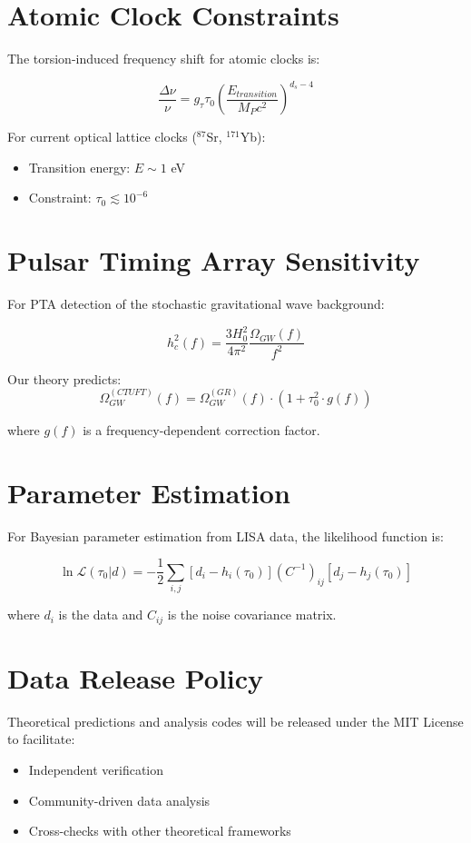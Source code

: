 \section{Atomic Clock Constraints}

The torsion-induced frequency shift for atomic clocks is:

\begin{equation}
    \frac{\Delta \nu}{\nu} = g_\tau \tau_0 \left(\frac{E_{transition}}{M_P c^2}\right)^{d_s - 4}
\end{equation}

For current optical lattice clocks ($^{87}$Sr, $^{171}$Yb):
\begin{itemize}
    \item Transition energy: $E \sim 1$ eV
    \item Constraint: $\tau_0 \lesssim 10^{-6}$
\end{itemize}

\section{Pulsar Timing Array Sensitivity}

For PTA detection of the stochastic gravitational wave background:

\begin{equation}
    h_c^2(f) = \frac{3H_0^2}{4\pi^2} \frac{\Omega_{GW}(f)}{f^2}
\end{equation}

Our theory predicts:
\begin{equation}
    \Omega_{GW}^{(CTUFT)}(f) = \Omega_{GW}^{(GR)}(f) \cdot (1 + \tau_0^2 \cdot g(f))
\end{equation}

where $g(f)$ is a frequency-dependent correction factor.

\section{Parameter Estimation}

For Bayesian parameter estimation from LISA data, the likelihood function is:

\begin{equation}
    \ln \mathcal{L}(\tau_0 | d) = -\frac{1}{2} \sum_{i,j} [d_i - h_i(\tau_0)] (C^{-1})_{ij} [d_j - h_j(\tau_0)]
\end{equation}

where $d_i$ is the data and $C_{ij}$ is the noise covariance matrix.

\section{Data Release Policy}

Theoretical predictions and analysis codes will be released under the MIT License to facilitate:
\begin{itemize}
    \item Independent verification
    \item Community-driven data analysis
    \item Cross-checks with other theoretical frameworks
\end{itemize}
